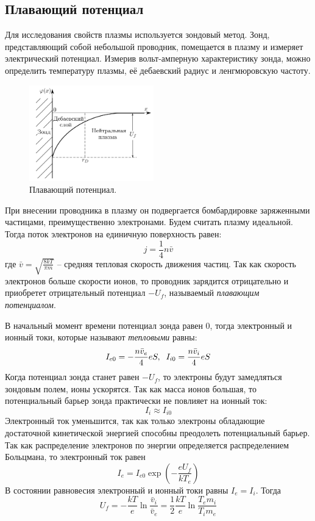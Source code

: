 \subsection*{Плавающий потенциал}

Для исследования свойств плазмы используется зондовый метод. Зонд, представляющий собой небольшой проводник, помещается в плазму и измеряет электрический потенциал. Измерив вольт-амперную характеристику зонда, можно определить температуру плазмы, её дебаевский радиус и ленгмюровскую частоту.

\begin{figure}
	\vspace{-10pt}
	\centering
	\includegraphics[width=0.48\textwidth]{../res/probe.png}
	\caption{Плавающий потенциал.}
	\label{img:plasma probe}
\end{figure}

При внесении проводника в плазму он подвергается бомбардировке заряженными частицами, преимущественно электронами. Будем считать плазму идеальной. Тогда поток электронов на единичную поверхность равен:
$$
j = \frac{1}{4} n \bar v
$$
где $\bar v = \sqrt{\frac{8 k T}{\pi m}}$ -- средняя тепловая скорость движения частиц. Так как скорость электронов больше скорости ионов, то проводник зарядится отрицательно и приобретет отрицательный потенциал $-U_f$, называемый \textit{плавающим потенциалом}.

В начальный момент времени потенциал зонда равен $0$, тогда электронный и ионный токи, которые называют \textit{тепловыми} равны:
$$
I_{e0} = -\frac{n \bar v_e}{4} eS, \hspace{2mm} I_{i0} = \frac{n \bar v_i}{4} eS
$$
Когда потенциал зонда станет равен $-U_f$, то электроны будут замедляться зондовым полем, ионы ускорятся. Так как масса ионов большая, то потенциальный барьер зонда практически не повлияет на ионный ток:
$$
I_i \approx I_{i0}
$$
Электронный ток уменьшится, так как только электроны обладающие достаточной кинетической энергией способны преодолеть потенциальный барьер. Так как распределение электронов по энергии определяется распределением Больцмана, то электронный ток равен
$$
I_{e} = I_{e0} \exp \left( -\frac{e U_f}{kT_e} \right)
$$
В состоянии равновесия электронный и ионный токи равны $I_e = I_i$. Тогда
$$
U_f = -\frac{kT}{e} \ln{\frac{\bar v_i}{\bar v_e}} = \frac{1}{2} \frac{kT}{e} \ln{\frac{T_e m_i}{T_i m_e}}
$$

